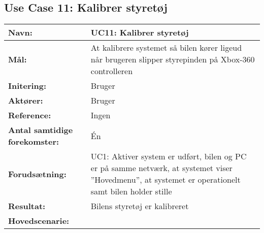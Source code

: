 \subsection{Use Case 11: Kalibrer styretøj}
\begin{table}[h]
\begin{tabularx}{\textwidth}{| >{\raggedright\arraybackslash}p{3.3 cm} | >{\raggedright\arraybackslash}X |} \hline

\textbf{Navn:} 						& UC11: Kalibrer styretøj												\\ \hline
\textbf{Mål:}						& At kalibrere systemet så bilen kører ligeud 
									  når brugeren slipper styrepinden på Xbox-360 controlleren 			\\ \hline
\textbf{Initering:}					& Bruger 																\\ \hline
\textbf{Aktører:} 					& Bruger																\\ \hline
\textbf{Reference:} 			    & Ingen																	\\ \hline
\textbf{Antal samtidige forekomster:} & Én 																	\\ \hline
\textbf{Forudsætning:} 				& UC1: Aktiver system er udført, bilen og PC er på samme netværk, 
									  at systemet viser ''Hovedmenu'', at systemet er operationelt 
									  samt bilen holder stille												\\ \hline
\textbf{Resultat:}					& Bilens styretøj er kalibreret 										\\ \hline
\textbf{Hovedscenarie:}				& 


\end{tabularx}
\end{table}
